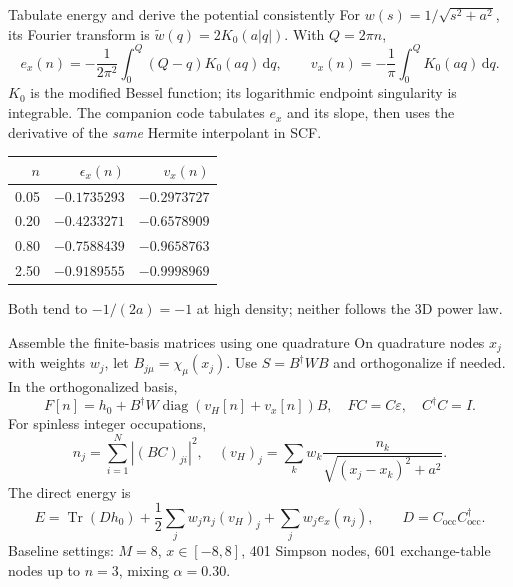 \documentclass[aspectratio=169,10pt]{beamer}
\newcommand{\dd}{\,\mathrm d}
\newcommand{\Tr}{\operatorname{Tr}}
\newcommand{\occ}{\mathrm{occ}}
\begin{document}
\begin{frame}{Tabulate energy and derive the potential consistently}
For $w(s)=1/\sqrt{s^2+a^2}$, its Fourier transform is
$\widetilde w(q)=2K_0(a|q|)$. With $Q=2\pi n$,
\[
 e_x(n)=-\frac1{2\pi^2}\int_0^Q(Q-q)K_0(aq)\dd q,
 \qquad v_x(n)=-\frac1\pi\int_0^QK_0(aq)\dd q.
\]
$K_0$ is the modified Bessel function; its logarithmic endpoint singularity
is integrable. The companion code tabulates $e_x$ and its slope, then uses
the derivative of the \emph{same} Hermite interpolant in SCF.
\begin{center}\small
\begin{tabular}{@{}rrr@{}}\toprule
$n$ & $\epsilon_x(n)$ & $v_x(n)$\\\midrule
0.05 & $-0.1735293$ & $-0.2973727$\\
0.20 & $-0.4233271$ & $-0.6578909$\\
0.80 & $-0.7588439$ & $-0.9658763$\\
2.50 & $-0.9189555$ & $-0.9998969$\\\bottomrule
\end{tabular}
\end{center}
Both tend to $-1/(2a)=-1$ at high density; neither follows the 3D power law.
\end{frame}

\begin{frame}{Assemble the finite-basis matrices using one quadrature}
On quadrature nodes $x_j$ with weights $w_j$, let $B_{j\mu}=\chi_\mu(x_j)$.
Use $S=B^\dagger W B$ and orthogonalize if needed. In the orthogonalized basis,
\[
 F[n]=h_0+B^\dagger W\operatorname{diag}(v_H[n]+v_x[n])B,
 \quad FC=C\varepsilon,\quad C^\dagger C=I.
\]
For spinless integer occupations,
\[
 n_j=\sum_{i=1}^{N}|(BC)_{ji}|^2,\quad
 (v_H)_j=\sum_k w_k\frac{n_k}{\sqrt{(x_j-x_k)^2+a^2}}.
\]
The direct energy is
\[
 E=\Tr(Dh_0)+\frac12\sum_j w_j n_j(v_H)_j+\sum_jw_j e_x(n_j),
 \qquad D=C_{\occ}C_{\occ}^\dagger.
\]
Baseline settings: $M=8$, $x\in[-8,8]$, 401 Simpson nodes,
601 exchange-table nodes up to $n=3$, mixing $\alpha=0.30$.
\end{frame}
\end{document}
